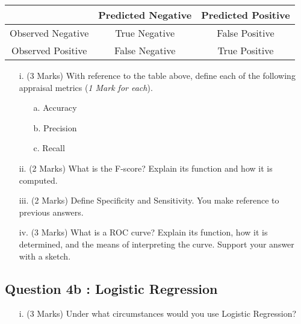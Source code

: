 \documentclass[a4paper,12pt]{article}
\begin{document}
\begin{center}
\begin{tabular}{|c|c|c|}
\hline  & Predicted Negative & Predicted Positive \\ 
\hline Observed Negative & True Negative & False Positive \\ 
\hline Observed Positive & False Negative & True Positive \\ 
\hline 
\end{tabular} 
\end{center}
\begin{itemize}
\item[i.](3 Marks) With reference to the table above, define each of the following appraisal metrics (\textit{1 Mark for each}).
\begin{itemize}
    \item[a.] Accuracy
    \item[b.] Precision
    \item[c.] Recall
    \end{itemize}
\item[ii.](2 Marks) What is the F-score? Explain its function and how it is computed.
\item[iii.](2 Marks) Define Specificity and Sensitivity. You make reference to previous answers.
\item[iv.](3 Marks) What is a ROC curve? Explain its function, how it is determined, and the means of interpreting the curve. Support your answer with a sketch.
\end{itemize}


\subsection*{Question 4b : Logistic Regression} %
\begin{itemize}
\item[i.](3 Marks) Under what circumstances would you use Logistic Regression?
\end{itemize}

%
\end{document}
